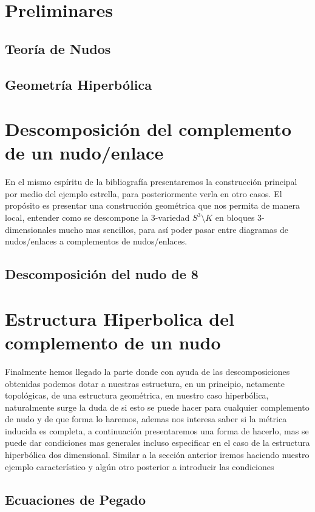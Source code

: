 \documentclass[12pt]{article}
\begin{document}
    \section{Preliminares}
    \subsection{Teoría de Nudos}
    
    \subsection{Geometría Hiperbólica}
    
    \section{Descomposición del complemento de un nudo/enlace}
    En el mismo espíritu de la bibliografía presentaremos la construcción principal por medio del ejemplo estrella, para posteriormente verla en otro casos. El propósito es presentar una construcción geométrica que nos permita de manera local, entender como se descompone la 3-variedad $S^3\setminus K$ en bloques 3-dimensionales mucho mas sencillos, para así poder pasar entre diagramas de nudos/enlaces a complementos de nudos/enlaces.
    \subsection{Descomposición del nudo de 8}
    
    \section{Estructura Hiperbolica del complemento de un nudo}
    Finalmente hemos llegado la parte donde con ayuda de las descomposiciones obtenidas podemos dotar a nuestras estructura, en un principio, netamente topológicas, de una estructura geométrica, en nuestro caso hiperbólica, naturalmente surge la duda de si esto se puede hacer para cualquier complemento de nudo y de que forma lo haremos, ademas nos interesa saber si la métrica inducida es completa, a continuación presentaremos una forma de hacerlo, mas se puede dar condiciones mas generales incluso especificar en el caso de la estructura hiperbólica dos dimensional. Similar a la sección anterior iremos haciendo nuestro ejemplo característico y algún otro posterior a introducir las condiciones
    \subsection{Ecuaciones de Pegado}
    
\end{document}
